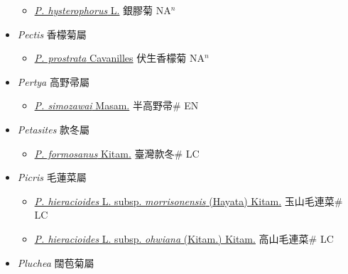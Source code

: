 \begin{itemize}
  \begin{itemize}
        \item[] \href{http://www.theplantlist.org/tpl1.1/search?q=Parthenium+hysterophorus}{\textit{P. hysterophorus} L.}   銀膠菊 NA$^n$
  \end{itemize}
 \item[] \textit{Pectis} 香檬菊屬
                    
  \begin{itemize}
        \item[] \href{http://www.theplantlist.org/tpl1.1/search?q=Pectis+prostrata}{\textit{P. prostrata} Cavanilles}   伏生香檬菊 NA$^n$
  \end{itemize}
 \item[] \textit{Pertya} 高野帚屬
                    
  \begin{itemize}
        \item[] \href{http://www.theplantlist.org/tpl1.1/search?q=Pertya+simozawai}{\textit{P. simozawai} Masam.}   半高野帚\# EN
  \end{itemize}
 \item[] \textit{Petasites} 款冬屬
                    
  \begin{itemize}
        \item[] \href{http://www.theplantlist.org/tpl1.1/search?q=Petasites+formosanus}{\textit{P. formosanus} Kitam.}   臺灣款冬\# LC
  \end{itemize}
 \item[] \textit{Picris} 毛蓮菜屬
                    
  \begin{itemize}
        \item[] \href{http://www.theplantlist.org/tpl1.1/search?q=Picris+hieracioides+subsp.+morrisonensis}{\textit{P. hieracioides} L. subsp. \textit{morrisonensis} (Hayata) Kitam.}   玉山毛連菜\# LC
        \item[] \href{http://www.theplantlist.org/tpl1.1/search?q=Picris+hieracioides+subsp.+ohwiana}{\textit{P. hieracioides} L. subsp. \textit{ohwiana} (Kitam.) Kitam.}   高山毛連菜\# LC
  \end{itemize}
 \item[] \textit{Pluchea} 闊苞菊屬
                    

\end{itemize}
